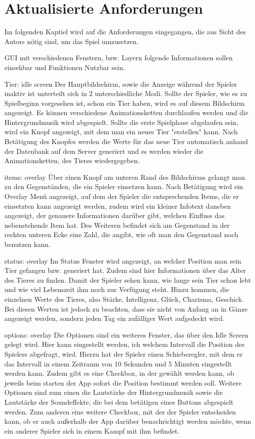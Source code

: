 \section{Aktualisierte Anforderungen}
\label{cha:ext_server}
Im folgenden Kaptiel wird auf die Anforderungen eingegangen, die aus Sicht des Autors nötig sind, um das Spiel umzusetzen.

GUI mit verschiedenen Fenstern, bzw. Layern
folgende Informationen sollen einsehbar und Funktionen Nutzbar sein.

Tier: idle screen
Der Hauptbildschirm, sowie die Anzeige während der Spieler inaktiv ist unterteilt sich in 2 unterschiedliche Modi. Sollte der Spieler, wie es zu Spielbeginn vorgesehen ist, schon ein Tier haben, wird es auf diesem Bildschirm angezeigt. Es können verschiedene Animationsketten durchlaufen werden und die Hintergrundmusik wird abgespielt. Sollte die erste Spielphase abgelaufen sein, wird ein Knopf angezeigt, mit dem man ein neues Tier "erstellen" kann. Nach Betätigung des Knopfes werden die Werte für das neue Tier automatisch anhand der Datenbank auf dem Server generiert und es werden wieder die Animationsketten, des Tieres wiedergegeben. 

items: overlay
Über einen Knopf am unteren Rand des Bildschirms gelangt man zu den Gegenständen, die ein Spieler einsetzen kann. Nach Betätigung wird ein Overlay Menü angezeigt, auf dem der Spieler die entsprechenden Items, die er einsetzten kann angezeigt werden, zudem wird ein kleiner Infotext daneben angezeigt, der genauere Informationen darüber gibt, welchen Einfluss das nebenstehende Item hat. Des Weiteren befindet sich am Gegenstand in der rechten unteren Ecke eine Zahl, die angibt, wie oft man den Gegenstand noch benutzen kann.

status: overlay
Im Status Fenster wird angezeigt, an welcher Position man sein Tier gefangen bzw. generiert hat. Zudem sind hier Informationen über das Alter des Tieres zu finden. Damit der Spieler sehen kann, wie lange sein Tier schon lebt und wie viel Lebenszeit ihm noch zur Verfügung steht. Hinzu kommen, die einzelnen Werte des Tieres, also Stärke, Intelligenz, Glück, Charisma, Geschick. Bei diesen Werten ist jedoch zu beachten, dass sie nicht von Anfang an in Gänze angezeigt werden, sondern jeden Tag ein zufälliger Wert aufgedeckt wird.

options: overlay
Die Optionen sind ein weiteres Fenster, das über den Idle Screen gelegt wird. Hier kann eingestellt werden, ich welchem Intervall die Position des Spielers abgefragt, wird. Hierzu hat der Spieler einen Schieberegler, mit dem er das Intervall in einem Zeitraum von 10 Sekunden und 5 Minuten eingestellt werden kann. Zudem gibt es eine Checkbox, in der gewählt werden kann, ob jeweils beim starten der App sofort die Position bestimmt werden soll. Weitere Optionen sind zum einen die Lautstärke der Hintergrundmusik sowie die Lautstärke der Soundeffekte, die bei dem betätigen eines Buttons abgespielt werden. Zum anderen eine weitere Checkbox, mit der der Spieler entscheiden kann, ob er auch außerhalb der App darüber benachrichtigt werden möchte, wenn ein anderer Spieler sich in einem Kampf mit ihm befindet.

